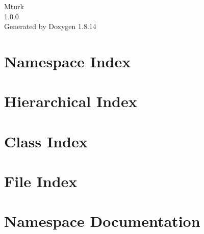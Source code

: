 \documentclass[twoside]{book}
\newcommand{\+}{\discretionary{\mbox{\scriptsize$\hookleftarrow$}}{}{}}
\newcommand{\clearemptydoublepage}{%
  \newpage{\pagestyle{empty}\cleardoublepage}%
}
\begin{document}
\hypersetup{pageanchor=false,
             bookmarksnumbered=true,
             pdfencoding=unicode
            }
\begin{titlepage}
\vspace*{7cm}
\begin{center}%
{\Large Mturk \\[1ex]\large 1.\+0.\+0 }\\
\vspace*{1cm}
{\large Generated by Doxygen 1.8.14}\\
\end{center}
\end{titlepage}
\clearemptydoublepage
{}
\tableofcontents
\clearemptydoublepage
{}
\hypersetup{pageanchor=true}

\chapter{Namespace Index}

\chapter{Hierarchical Index}

\chapter{Class Index}

\chapter{File Index}

\chapter{Namespace Documentation}

\end{document}
